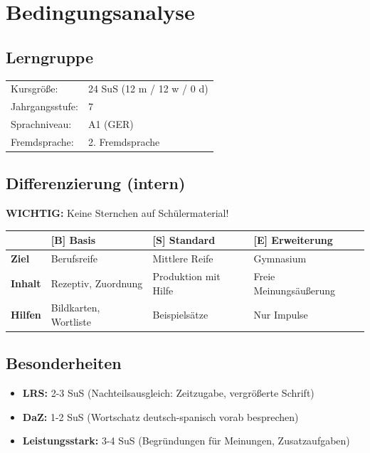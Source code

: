 \documentclass[11pt,a4paper]{article}
\newcommand{\jahrgangsstufe}{7}
\newcommand{\lerngruppengroesse}{24}
\newcommand{\maennlich}{12}
\newcommand{\weiblich}{12}
\newcommand{\divers}{0}
\newcommand{\gerniveau}{A1}
\begin{document}
\section{Bedingungsanalyse}

\subsection{Lerngruppe}
\begin{tabular}{ll}
    Kursgröße: & \lerngruppengroesse{} SuS (\maennlich{} m / \weiblich{} w / \divers{} d) \\
    Jahrgangsstufe: & \jahrgangsstufe \\
    Sprachniveau: & \gerniveau{} (GER) \\
    Fremdsprache: & 2. Fremdsprache \\
\end{tabular}

\subsection{Differenzierung (intern)}

\textbf{WICHTIG:} Keine Sternchen auf Schülermaterial!

\begin{tabular}{|l|p{4cm}|p{4cm}|p{4cm}|}
\hline
& \textbf{[B] Basis} & \textbf{[S] Standard} & \textbf{[E] Erweiterung} \\
\hline
\textbf{Ziel} & Berufsreife & Mittlere Reife & Gymnasium \\
\hline
\textbf{Inhalt} & Rezeptiv, Zuordnung & Produktion mit Hilfe & Freie Meinungsäußerung \\
\hline
\textbf{Hilfen} & Bildkarten, Wortliste & Beispielsätze & Nur Impulse \\
\hline
\end{tabular}

\subsection{Besonderheiten}
\begin{itemize}
    \item \textbf{LRS:} 2-3 SuS (Nachteilsausgleich: Zeitzugabe, vergrößerte Schrift)
    \item \textbf{DaZ:} 1-2 SuS (Wortschatz deutsch-spanisch vorab besprechen)
    \item \textbf{Leistungsstark:} 3-4 SuS (Begründungen für Meinungen, Zusatzaufgaben)
\end{itemize}
\end{document}
